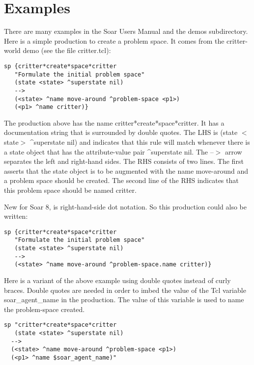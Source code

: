 \documentclass[10pt]{article}
\begin{document}
\section*{ Examples }


 There are many examples in the Soar Users Manual and the demos subdirectory. Here is a simple production to create a problem space. It comes from the critter-world demo (see the file critter.tcl): \begin{verbatim}
sp {critter*create*space*critter
   "Formulate the initial problem space"
   (state <state> ^superstate nil)
   -->
   (<state> ^name move-around ^problem-space <p1>)
   (<p1> ^name critter)}

\end{verbatim}



 The production above has the name critter*create*space*critter. It has a documentation string that is surrounded by double quotes. The LHS is (state $<$state$>$ \^{}superstate nil) and indicates that this rule will match whenever there is a state object that has the attribute-value pair \^{}superstate nil. The --$>$ arrow separates the left and right-hand sides. The RHS consists of two lines. The first asserts that the state object is to be augmented with the name move-around and a problem space should be created. The second line of the RHS indicates that this problem space should be named critter. 


  New for Soar 8, is right-hand-side dot notation. So this production could also be written: \begin{verbatim}
sp {critter*create*space*critter
   "Formulate the initial problem space"
   (state <state> ^superstate nil)
   -->
   (<state> ^name move-around ^problem-space.name critter)}

\end{verbatim}



 Here is a variant of the above example using double quotes instead of curly braces. Double quotes are needed in order to imbed the value of the Tcl variable soar\_agent\_name in the production. The value of this variable is used to name the problem-space created. \begin{verbatim}
sp "critter*create*space*critter
   (state <state> ^superstate nil)
  -->
  (<state> ^name move-around ^problem-space <p1>)
  (<p1> ^name $soar_agent_name)"

\end{verbatim}
\end{document}
